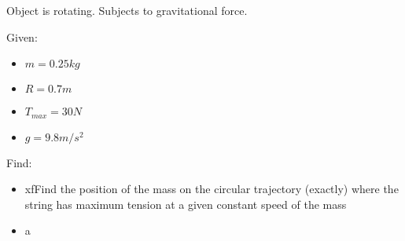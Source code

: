 

Object is rotating. Subjects to gravitational force.


\bigbreak Given: 
\begin{itemize}
    \item $  m  = 0.25kg $
    \item $ R = 0.7m $
    \item $ T_{max} = 30N $
    \item $ g = 9.8m/s^2 $
\end{itemize}


Find:

\begin{itemize}
    \item xfFind the position of the mass on the circular trajectory (exactly) where the string has
    maximum tension at a given constant speed of the mass
    \item a
\end{itemize}
